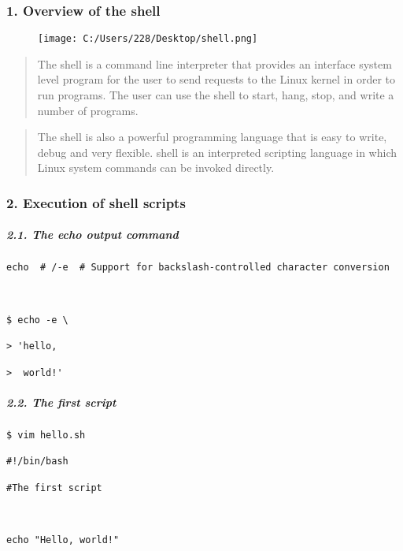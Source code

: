 \documentclass[
]{article}
\begin{document}
\hypertarget{header-n194}{%
\subsubsection{1. Overview of the shell}\label{header-n194}}

\begin{figure}
\centering
\texttt{[image: C:/Users/228/Desktop/shell.png]}
\caption{}
\end{figure}

\begin{quote}
The shell is a command line interpreter that provides an interface
system level program for the user to send requests to the Linux kernel
in order to run programs. The user can use the shell to start, hang,
stop, and write a number of programs.
\end{quote}

\begin{quote}
The shell is also a powerful programming language that is easy to write,
debug and very flexible. shell is an interpreted scripting language in
which Linux system commands can be invoked directly.
\end{quote}

\hypertarget{header-n158}{%
\subsubsection{2. Execution of shell scripts}\label{header-n158}}

\hypertarget{header-n276}{%
\subparagraph{2.1. The echo output command}\label{header-n276}}

\begin{verbatim}
echo  # /-e  # Support for backslash-controlled character conversion



$ echo -e \

> 'hello,

>  world!'
\end{verbatim}

\hypertarget{header-n259}{%
\subparagraph{2.2. The first script}\label{header-n259}}

\begin{verbatim}
$ vim hello.sh

#!/bin/bash

#The first script



echo "Hello, world!"
\end{verbatim}
\end{document}
